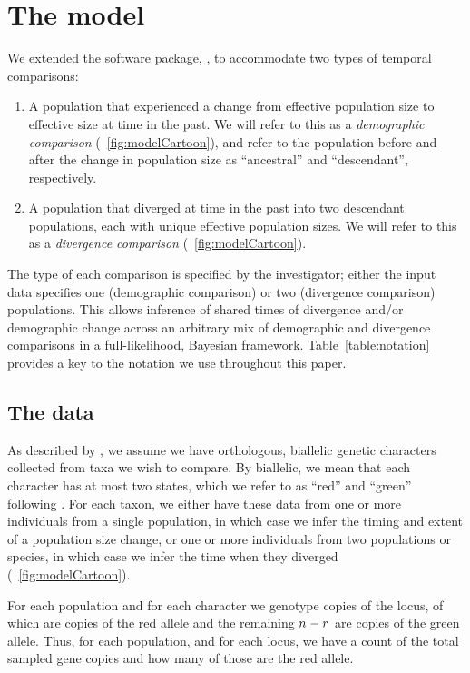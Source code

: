 \section{The model}

We extended the software package, \ecoevolity, to accommodate two types of
temporal comparisons:
\begin{enumerate}
    \item A population that experienced a change from effective population size
        \epopsize[\rootpopindex]
        to effective size
        \epopsize[\descendantpopindex{}]
        at time \comparisonetime in the past.
        We will refer to this as a \emph{demographic comparison}
        (\fig{}~\ref{fig:modelCartoon}),
        and refer to the population before and after the change in population
        size as ``ancestral'' and ``descendant'', respectively.
    \item A population that diverged at time \comparisonetime in the past into
        two descendant populations, each with unique effective population
        sizes.
        We will refer to this as a \emph{divergence comparison}
        (\fig{}~\ref{fig:modelCartoon}).
\end{enumerate}
The type of each comparison is specified by the investigator; either the input
data specifies one (demographic comparison) or two (divergence comparison)
populations.
This allows inference of shared times of divergence and/or demographic change
across an arbitrary mix of demographic and divergence comparisons in a
full-likelihood, Bayesian framework.
Table~\ref{table:notation} provides a key to the notation we use throughout
this paper.

\subsection{The data}
As described by \citet{Oaks2018ecoevolity},
we assume we have orthologous, biallelic genetic characters collected from
taxa we wish to compare.
By biallelic, we mean that each character has at most two states,
which we refer to as ``red'' and ``green'' following \citet{Bryant2012}.
For each taxon, we either have these data from one or more individuals from a
single population, in which case we infer the timing and extent of a population
size change, or one or more individuals from two populations or species,
in which case we infer the time when they diverged (\fig{}~\ref{fig:modelCartoon}).

For each population and for each character we genotype \allelecount copies
of the locus, \redallelecount of which are copies of the red allele and the
remaining $n_{}^{} - r_{}^{}$ are copies of the green allele.
Thus, for each population, and for each locus, we have a count of the
total sampled gene copies and how many of those are the red allele.

